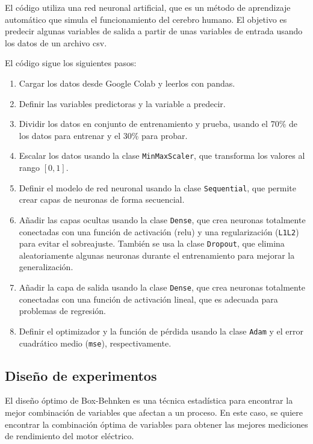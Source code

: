 \documentclass{article}
\begin{document}
El código utiliza una red neuronal artificial, que es un método de aprendizaje automático que simula el funcionamiento del cerebro humano. El objetivo es predecir algunas variables de salida a partir de unas variables de entrada  usando los datos de un archivo csv.

El código sigue los siguientes pasos:

\begin{enumerate}
\item Cargar los datos desde Google Colab y leerlos con pandas.
\item Definir las variables predictoras y la variable a predecir.
\item Dividir los datos en conjunto de entrenamiento y prueba, usando el 70\% de los datos para entrenar y el 30\% para probar.
\item Escalar los datos usando la clase \lstinline{MinMaxScaler}, que transforma los valores al rango $[0, 1]$.
\item Definir el modelo de red neuronal usando la clase \lstinline{Sequential}, que permite crear capas de neuronas de forma secuencial.
\item Añadir las capas ocultas usando la clase \lstinline{Dense}, que crea neuronas totalmente conectadas con una función de activación ($\text{relu}$) y una regularización (\lstinline{L1L2}) para evitar el sobreajuste. También se usa la clase \lstinline{Dropout}, que elimina aleatoriamente algunas neuronas durante el entrenamiento para mejorar la generalización.
\item Añadir la capa de salida usando la clase \lstinline{Dense}, que crea neuronas totalmente conectadas con una función de activación lineal, que es adecuada para problemas de regresión.
\item Definir el optimizador y la función de pérdida usando la clase \lstinline{Adam} y el error cuadrático medio (\lstinline{mse}), respectivamente.
\end{enumerate}

\subsection{Diseño de experimentos}

El diseño óptimo de Box-Behnken es una técnica estadística para encontrar la mejor combinación de variables que afectan a un proceso. En este caso, se quiere encontrar la combinación óptima de variables para obtener las mejores mediciones de rendimiento del motor eléctrico. 
\end{document}
